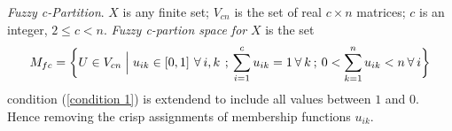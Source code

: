 \begin{definition}\cite{bezdek1981pattern}
	\emph{Fuzzy c-Partition}\label{def:Fuzzy c-Partition}.\hspace{2pt} $ X $\hspace{2pt} is any finite set;\hspace{2pt} $V_{cn}$ is the set of real\hspace{2pt} $c\times n$\hspace{2pt} matrices;\hspace{2pt} $c$\hspace{2pt} is an integer,\hspace{2pt} $2\leq c< n$.\hspace{2pt} \emph{Fuzzy c-partion space for}\hspace{2pt} $X$\hspace{2pt} is the set
	\begin{equation}\label{Fuzzy set space}
		M_{fc}= \bigg\{ U\in V_{cn}\Bigm| u_{ik}\in \left[ 0,1\right]\hspace{2pt}  \forall\hspace{2pt} i,k\hspace{2pt} \hspace{2pt};\hspace{2pt} \sum_{i=1}^{c} u_{ik}=1\hspace{2pt} \forall\hspace{2pt} k \hspace{2pt};\hspace{2pt}  0<\sum_{k=1}^{n} u_{ik}< n \hspace{2pt} \forall\hspace{2pt} i \bigg\}
	\end{equation}
	condition (\ref{condition 1}) is extendend to include all values between $1$ and $0$. Hence removing the crisp assignments of membership functions $u_{ik}$\cite{bezdek1981pattern}.
	
\end{definition}

